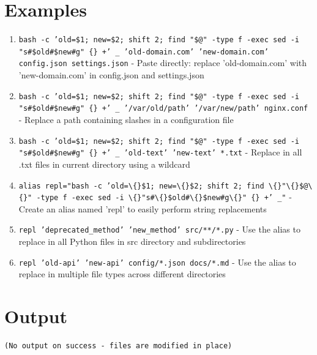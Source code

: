 \documentclass[openany]{book}
\begin{document}
\section*{Examples}
\begin{enumerate}
  \item \texttt{bash -c 'old=\$1; new=\$2; shift 2; find "\$@" -type f -exec sed -i "s\#\$old\#\$new\#g" \{\} +' \_ 'old-domain.com' 'new-domain.com' config.json settings.json} - Paste directly: replace 'old-domain.com' with 'new-domain.com' in config.json and settings.json
  \item \texttt{bash -c 'old=\$1; new=\$2; shift 2; find "\$@" -type f -exec sed -i "s\#\$old\#\$new\#g" \{\} +' \_ '/var/old/path' '/var/new/path' nginx.conf} - Replace a path containing slashes in a configuration file
  \item \texttt{bash -c 'old=\$1; new=\$2; shift 2; find "\$@" -type f -exec sed -i "s\#\$old\#\$new\#g" \{\} +' \_ 'old-text' 'new-text' *.txt} - Replace in all .txt files in current directory using a wildcard
  \item \texttt{alias repl="bash -c 'old=\textbackslash\{\}\$1; new=\textbackslash\{\}\$2; shift 2; find \textbackslash\{\}"\textbackslash\{\}\$@\textbackslash\{\}" -type f -exec sed -i \textbackslash\{\}"s\#\textbackslash\{\}\$old\#\textbackslash\{\}\$new\#g\textbackslash\{\}" \{\} +' \_"} - Create an alias named 'repl' to easily perform string replacements
  \item \texttt{repl 'deprecated\_method' 'new\_method' src/**/*.py} - Use the alias to replace in all Python files in src directory and subdirectories
  \item \texttt{repl 'old-api' 'new-api' config/*.json docs/*.md} - Use the alias to replace in multiple file types across different directories
\end{enumerate}

\section*{Output}
\begin{lstlisting}
(No output on success - files are modified in place)
\end{lstlisting}
\end{document}
